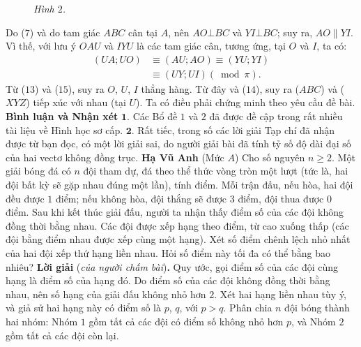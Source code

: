 \begin{multicols}{2}
\begin{figure}[H]
		\vspace*{-10pt}
		\caption{\small\textit{\color{thachthuctoanhoc}Hình $2$.}}
		\vspace*{-15pt}
	\end{figure}
	Do ($7$) và do tam giác $ABC$ cân tại $A$, nên $AO \bot BC$ và $YI \bot BC$; suy ra, $AO \parallel YI$. Vì thế, với lưu ý $OAU$ và $IYU$ là các tam giác cân, tương ứng, tại $O$ và $I$, ta có:
	\begin{align*}
		\left( {UA;UO} \right) &\equiv \left( {AU;AO} \right) \equiv \left( {YU;YI} \right) \\
		&\equiv \left( {UY;UI} \right)\left( {\bmod \pi } \right). \tag{$15$}
	\end{align*}
	Từ ($13$) và ($15$), suy ra $O$, $U$, $I$ thẳng hàng. Từ đây và ($14$), suy ra ($ABC$) và ($XYZ$) tiếp xúc với nhau (tại $U$). Ta có điều phải chứng minh theo yêu cầu đề bài.
	\vskip 0.05cm
	\textbf{\color{thachthuctoanhoc}Bình luận và Nhận xét}
	\vskip 0.05cm
	$\pmb{1.}$ Các Bổ đề $1$ và $2$ đã được đề cập trong rất nhiều tài liệu về Hình học sơ cấp.
	\vskip 0.05cm
	$\pmb{2.}$ Rất tiếc, trong số các lời giải Tạp chí đã nhận được từ bạn đọc, có một lời giải sai, do người giải bài đã tính tỷ số độ dài đại số của hai vectơ không đồng trục.
	\vskip 0.1cm
	\hfill	\textbf{\color{thachthuctoanhoc}Hạ Vũ Anh}
	\vskip 0.1cm
	{}
	(Mức $A$) Cho số nguyên $n \ge 2$. Một giải bóng đá có $n$ đội tham dự, đá theo thể thức vòng tròn một lượt (tức là, hai đội bất kỳ sẽ gặp nhau đúng một lần), tính điểm. Mỗi trận đấu, nếu hòa, hai đội đều được $1$ điểm; nếu không hòa, đội thắng sẽ được $3$ điểm, đội thua được $0$ điểm. Sau khi kết thúc giải đấu, người ta nhận thấy điểm số của các đội không đồng thời bằng nhau. Các đội được xếp hạng theo điểm, từ cao xuống thấp (các đội bằng điểm nhau được xếp cùng một hạng). Xét số điểm chênh lệch nhỏ nhất của hai đội xếp thứ hạng liền nhau. Hỏi số điểm này tối đa có thể bằng bao nhiêu?
	\vskip 0.05cm
	\textbf{\color{thachthuctoanhoc}Lời giải} (\textit{của người chấm bài})\textbf{\color{thachthuctoanhoc}.}
	\vskip 0.05cm
	Quy ước, gọi điểm số của các đội cùng hạng là điểm số của hạng đó.
	\vskip 0.05cm
	Do điểm số của các đội không đồng thời bằng nhau, nên số hạng của giải đấu không nhỏ hơn $2$.
	\vskip 0.05cm
	Xét hai hạng liền nhau tùy ý, và giả sử hai hạng này có điểm số là $p$, $q$, với $p > q$.
	\vskip 0.05cm
	Phân chia $n$ đội bóng thành hai nhóm: Nhóm $1$ gồm tất cả các đội có điểm số không nhỏ hơn $p$, và Nhóm $2$ gồm tất cả các đội còn lại.
	\vskip 0.05cm

\end{multicols}
